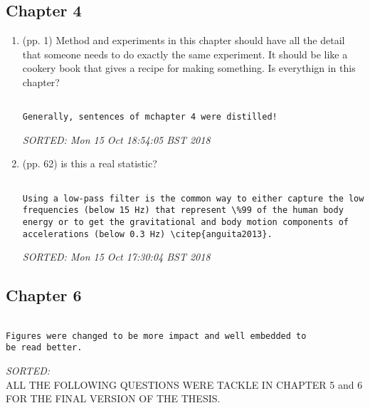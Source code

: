 \documentclass[10pt]{article}
\begin{document}
\subsection{Chapter 4}

\begin{enumerate}

\item (pp. 1) Method and experiments in this chapter should have all
	the detail that someone needs to do exactly the same experiment.
	It should be like a cookery book that gives a recipe for 
	making something. 
	Is everythign in this chapter?



\begin{verbatim}

Generally, sentences of mchapter 4 were distilled!

\end{verbatim}
\textit{
SORTED: 
Mon 15 Oct 18:54:05 BST 2018
}
\\



\item (pp. 62) is this a real statistic?


\begin{verbatim}

Using a low-pass filter is the common way to either capture the low 
frequencies (below 15 Hz) that represent \%99 of the human body 
energy or to get the gravitational and body motion components of 
accelerations (below 0.3 Hz) \citep{anguita2013}.

\end{verbatim}
\textit{
SORTED: 
Mon 15 Oct 17:30:04 BST 2018
}
\\





\end{enumerate}


\subsection{Chapter 6}



\begin{verbatim}

Figures were changed to be more impact and well embedded to
be read better.
\end{verbatim}
\textit{
SORTED: 
}
\\


ALL THE FOLLOWING QUESTIONS WERE TACKLE 
IN CHAPTER 5 and 6 
FOR THE FINAL VERSION OF THE THESIS. 
\end{document}
